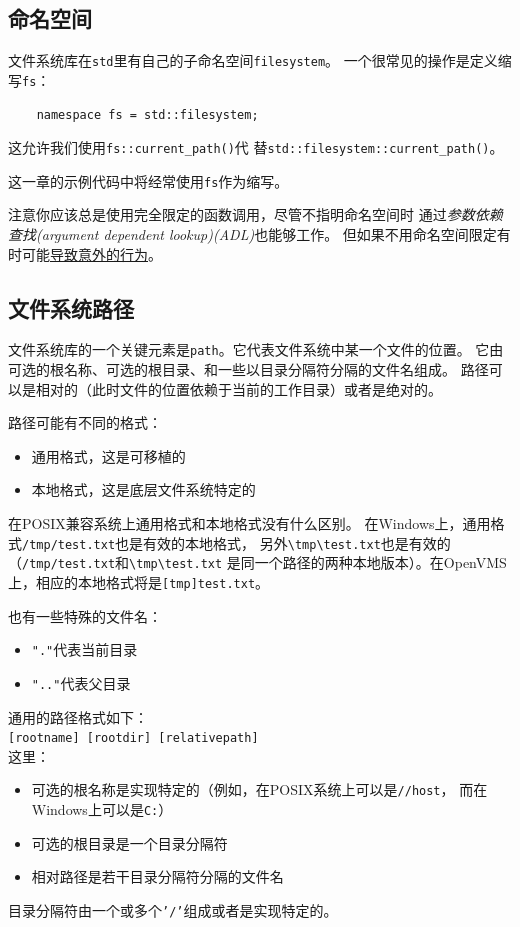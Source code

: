 \subsection{命名空间}
文件系统库在\texttt{std}里有自己的子命名空间\texttt{filesystem}。
一个很常见的操作是定义缩写\texttt{fs}：
\begin{lstlisting}
    namespace fs = std::filesystem;
\end{lstlisting}
这允许我们使用\texttt{fs::current\_path()}代
替\texttt{std::filesystem::current\_path()}。

这一章的示例代码中将经常使用\texttt{fs}作为缩写。

注意你应该总是使用完全限定的函数调用，尽管不指明命名空间时
通过\emph{参数依赖查找(argument dependent lookup)(ADL)}也能够工作。
但如果不用命名空间限定有时可能\hyperref[ADL导致意外行为]{导致意外的行为}。

\subsection{文件系统路径}\label{ch20.2.3}
文件系统库的一个关键元素是\texttt{path}。它代表文件系统中某一个文件的位置。
它由可选的根名称、可选的根目录、和一些以目录分隔符分隔的文件名组成。
路径可以是相对的（此时文件的位置依赖于当前的工作目录）或者是绝对的。

路径可能有不同的格式：
\begin{itemize}
    \item 通用格式，这是可移植的
    \item 本地格式，这是底层文件系统特定的
\end{itemize}
在POSIX兼容系统上通用格式和本地格式没有什么区别。
在Windows上，通用格式\texttt{/tmp/test.txt}也是有效的本地格式，
另外\texttt{\textbackslash tmp\textbackslash test.txt}也是有效的
（\texttt{/tmp/test.txt}和\texttt{\textbackslash tmp\textbackslash test.txt}
是同一个路径的两种本地版本）。在OpenVMS上，相应的本地格式将是\texttt{[tmp]test.txt}。

也有一些特殊的文件名：
\begin{itemize}
    \item \texttt{"."}代表当前目录
    \item \texttt{".."}代表父目录
\end{itemize}
通用的路径格式如下：\\
\hspace*{2em}\texttt{[rootname] [rootdir] [relativepath]}\\
这里：
\begin{itemize}
    \item 可选的根名称是实现特定的（例如，在POSIX系统上可以是\texttt{//host}，
    而在Windows上可以是\texttt{C:}）
    \item 可选的根目录是一个目录分隔符
    \item 相对路径是若干目录分隔符分隔的文件名
\end{itemize}
目录分隔符由一个或多个\texttt{'/'}组成或者是实现特定的。

